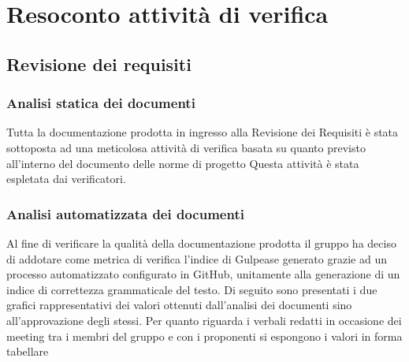 \section{Resoconto attività di verifica}
\subsection{Revisione dei requisiti}
\subsubsection{Analisi statica dei documenti}
Tutta la documentazione prodotta in ingresso alla Revisione dei Requisiti è stata sottoposta ad una meticolosa attività di verifica
basata su quanto previsto all'interno del documento delle norme di progetto
Questa attività è stata espletata dai verificatori.

\subsubsection{Analisi automatizzata dei documenti}
Al fine di verificare la qualità della documentazione prodotta il gruppo ha deciso di addotare come metrica di verifica
l'indice di Gulpease generato grazie ad un processo automatizzato configurato in GitHub, unitamente alla generazione di un indice di 
correttezza grammaticale del testo.
Di seguito sono presentati i due grafici rappresentativi dei valori ottenuti dall'analisi dei documenti sino all'approvazione degli stessi.
Per quanto riguarda i verbali redatti in occasione dei meeting tra i membri del gruppo e con i proponenti si espongono i valori in forma tabellare


